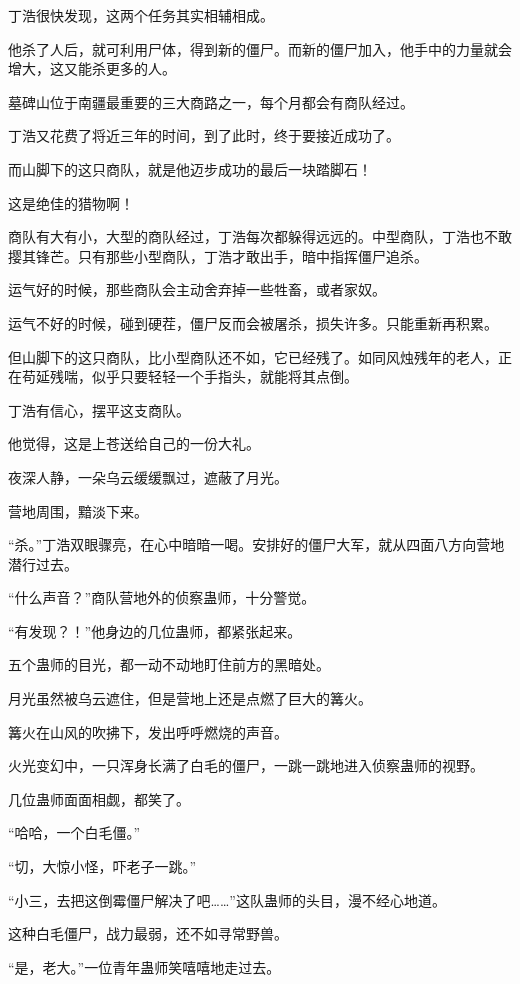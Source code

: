 \begin{this_body}
丁浩很快发现，这两个任务其实相辅相成。

他杀了人后，就可利用尸体，得到新的僵尸。而新的僵尸加入，他手中的力量就会增大，这又能杀更多的人。

墓碑山位于南疆最重要的三大商路之一，每个月都会有商队经过。

丁浩又花费了将近三年的时间，到了此时，终于要接近成功了。

而山脚下的这只商队，就是他迈步成功的最后一块踏脚石！

这是绝佳的猎物啊！

商队有大有小，大型的商队经过，丁浩每次都躲得远远的。中型商队，丁浩也不敢撄其锋芒。只有那些小型商队，丁浩才敢出手，暗中指挥僵尸追杀。

运气好的时候，那些商队会主动舍弃掉一些牲畜，或者家奴。

运气不好的时候，碰到硬茬，僵尸反而会被屠杀，损失许多。只能重新再积累。

但山脚下的这只商队，比小型商队还不如，它已经残了。如同风烛残年的老人，正在苟延残喘，似乎只要轻轻一个手指头，就能将其点倒。

丁浩有信心，摆平这支商队。

他觉得，这是上苍送给自己的一份大礼。

夜深人静，一朵乌云缓缓飘过，遮蔽了月光。

营地周围，黯淡下来。

“杀。”丁浩双眼骤亮，在心中暗暗一喝。安排好的僵尸大军，就从四面八方向营地潜行过去。

“什么声音？”商队营地外的侦察蛊师，十分警觉。

“有发现？！”他身边的几位蛊师，都紧张起来。

五个蛊师的目光，都一动不动地盯住前方的黑暗处。

月光虽然被乌云遮住，但是营地上还是点燃了巨大的篝火。

篝火在山风的吹拂下，发出呼呼燃烧的声音。

火光变幻中，一只浑身长满了白毛的僵尸，一跳一跳地进入侦察蛊师的视野。

几位蛊师面面相觑，都笑了。

“哈哈，一个白毛僵。”

“切，大惊小怪，吓老子一跳。”

“小三，去把这倒霉僵尸解决了吧……”这队蛊师的头目，漫不经心地道。

这种白毛僵尸，战力最弱，还不如寻常野兽。

“是，老大。”一位青年蛊师笑嘻嘻地走过去。


\end{this_body}
